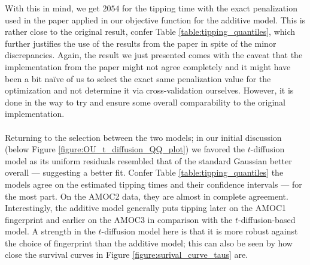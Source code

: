 With this in mind, we get $2054$ for the tipping time with the exact penalization used in the paper applied in our objective function for the additive model. This is rather close to the original result, confer Table \ref{table:tipping_quantiles}, which further justifies the use of the results from the paper in spite of the minor discrepancies. Again, the result we just presented comes with the caveat that the implementation from the paper might not agree completely and it might have been a bit naïve of us to select the exact same penalization value for the optimization and not determine it via cross-validation ourselves. However, it is done in the way to try and ensure some overall comparability to the original implementation.\\\\
Returning to the selection between the two models; in our initial discussion (below Figure \ref{figure:OU_t_diffusion_QQ_plot}) we favored the $t$-diffusion model as its uniform residuals resembled that of the standard Gaussian better overall — suggesting a better fit. Confer Table \ref{table:tipping_quantiles} the models agree on the estimated tipping times and their confidence intervals — for the most part. On the AMOC2 data, they are almost in complete agreement. Interestingly, the additive model generally puts tipping later on the AMOC1 fingerprint and earlier on the AMOC3 in comparison with the $t$-diffusion-based model. A strength in the $t$-diffusion model here is that it is more robust against the choice of fingerprint than the additive model; this can also be seen by how close the survival curves in Figure \ref{figure:surival_curve_taus} are.


